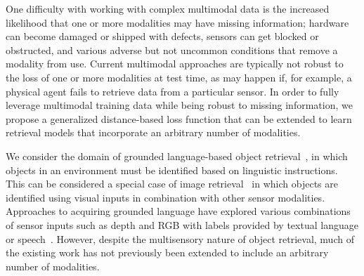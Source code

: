 \documentclass[10pt]{article} %
\begin{document}
One difficulty with working with complex multimodal data is the increased likelihood that one or more modalities may have missing information; hardware can become damaged or shipped with defects, sensors can get blocked or obstructed, and various adverse but not uncommon conditions that remove a modality from use.
Current multimodal approaches are typically not robust to the loss of one or more modalities at test time, as may happen if, for example, a physical agent fails to retrieve data from a particular sensor. In order to fully leverage multimodal training data while being robust to missing information, we propose a generalized distance-based loss function that can be extended to learn retrieval models that incorporate an arbitrary number of modalities.

We consider the domain of grounded language-based object retrieval~\cite{hu2016natural, triplet_loss_2021_CVPR}, in which objects in an environment must be identified based on linguistic instructions. This can be considered a special case of image retrieval~\cite{huang2017deep, ma2020large, novak2015large, vo2019composing} in which objects are identified using visual inputs in combination with other sensor modalities. Approaches to acquiring grounded language have explored various combinations of sensor inputs such as depth and RGB with labels provided by textual language or  speech~\cite{RichardsDarvishMatuszekCategoryFree20}. 
However, despite the multisensory nature of object retrieval, much of the existing work has not previously been extended to include an arbitrary number of modalities. 
\end{document}

